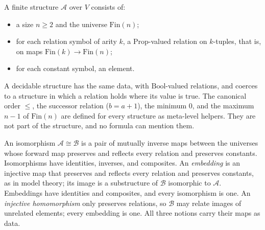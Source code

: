 \begin{definition}
  \label{def:desc-structure}
  \leanok
  A finite structure $\mathcal{A}$ over $V$ consists of:
  \begin{itemize}
    \item a size $n \ge 2$ and the universe $\mathrm{Fin}(n)$;
    \item for each relation symbol of arity $k$, a $\mathrm{Prop}$-valued
      relation on $k$-tuples, that is, on maps
      $\mathrm{Fin}(k) \to \mathrm{Fin}(n)$;
    \item for each constant symbol, an element.
  \end{itemize}
  A decidable structure has the same data, with $\mathrm{Bool}$-valued
  relations, and coerces to a structure in which a relation holds where its value
  is $\mathrm{true}$. The canonical order $\le$, the successor relation
  ($b = a + 1$), the minimum $0$, and the maximum $n - 1$ of $\mathrm{Fin}(n)$
  are defined for every structure as meta-level helpers. They are not part of the
  structure, and no formula can mention them.
\end{definition}

\begin{definition}
  \label{def:desc-iso}
  \leanok
  An isomorphism $\mathcal{A} \cong \mathcal{B}$ is a pair of mutually inverse
  maps between the universes whose forward map preserves and reflects every
  relation and preserves constants. Isomorphisms have identities, inverses, and
  composites. An \emph{embedding} is an injective map that preserves and
  reflects every relation and preserves constants, as in model theory; its
  image is a substructure of $\mathcal{B}$ isomorphic to $\mathcal{A}$.
  Embeddings have identities and composites, and every isomorphism is one. An
  \emph{injective homomorphism} only preserves relations, so $\mathcal{B}$ may
  relate images of unrelated elements; every embedding is one. All three
  notions carry their maps as data.
\end{definition}

